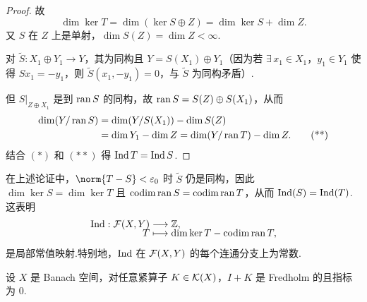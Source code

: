 \begin{proof}
故
\begin{equation}
\dim \ker T = \dim(\ker S \oplus Z) = \dim \ker S + \dim Z. \tag{*}
\end{equation}
又 $S$ 在 $Z$ 上是单射，$\dim S(Z) = \dim Z < \infty$.\par
对 $\widetilde{S}: X_1 \oplus Y_1 \to Y$，其为同构且 $Y = S(X_1) \oplus Y_1$（因为若 $\exists\, x_1 \in X_1$，$y_1 \in Y_1$ 使得 $Sx_1 = -y_1$，则 $\widetilde{S}(x_1,-y_1)=0$，与 $\widetilde{S}$ 为同构矛盾）.\par
但 $S|_{Z \oplus X_1}$ 是到 $\operatorname{ran} S$ 的同构，故 $\operatorname{ran} S = S(Z) \oplus S(X_1)$，从而
\begin{align*}
\dim(Y/\operatorname{ran} S) &= \dim(Y/S(X_1)) - \dim S(Z) \\
&= \dim Y_1 - \dim Z = \dim(Y/\operatorname{ran} T) - \dim Z. \tag{**}
\end{align*}
结合 $(*)$ 和 $(**)$ 得 $\operatorname{Ind} T = \operatorname{Ind} S$.
\end{proof}


\begin{note}
在上述论证中，$\norm{T-S}<\varepsilon_0$ 时 $\widetilde{S}$ 仍是同构，因此 $\dim\ker S = \dim\ker T$ 且 $\operatorname{codim}\operatorname{ran} S = \operatorname{codim}\operatorname{ran} T$，从而 $\operatorname{Ind}(S) = \operatorname{Ind}(T)$.这表明
\begin{align*}
    \operatorname{Ind}: \mathcal{F}(X,Y)&\longrightarrow\mathbb{Z},\\[-6pt]
    T&\longmapsto \dim\ker T - \operatorname{codim}\operatorname{ran} T,
\end{align*}
是局部常值映射.特别地，$\operatorname{Ind}$ 在 $\mathcal{F}(X,Y)$ 的每个连通分支上为常数.
\end{note}



\begin{theorem}
设 $X$ 是 Banach 空间，对任意紧算子 $K\in\mathcal{K}(X)$，$I+K$ 是 Fredholm 的且指标为 $0$.
\end{theorem}

